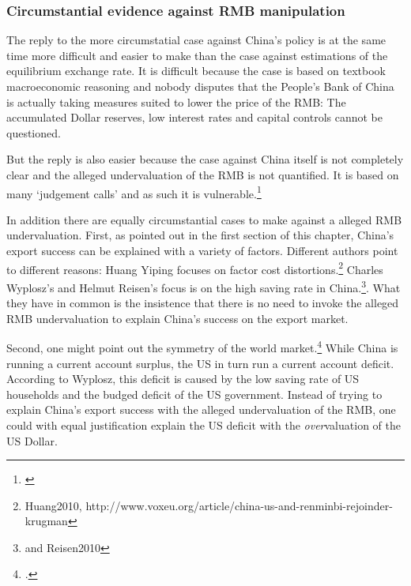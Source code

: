 \documentclass[11pt]{article}
\begin{document}



\subsubsection{Circumstantial evidence against RMB manipulation}

The reply to the more circumstatial case against China's policy is at the same time more difficult and easier to make than the case against estimations of the equilibrium exchange rate. It is difficult because the case is based on textbook macroeconomic reasoning and nobody disputes that the People's Bank of China is actually taking measures suited to lower the price of the RMB: The accumulated Dollar reserves, low interest rates and capital controls cannot be questioned.

But the reply is also easier because the case against China itself is not completely clear and the alleged undervaluation of the RMB is not quantified. It is based on many  `judgement calls' and as such it is vulnerable.\footnote{\cite[p. 85]{CheungChinnFujii2010}}

In addition there are equally circumstantial cases to make against a alleged RMB undervaluation. First, as pointed out in the first section of this chapter, China's export success can be explained with a variety of factors.  Different authors point to different reasons: Huang Yiping focuses on factor cost distortions.\footnote{Huang2010, http://www.voxeu.org/article/china-us-and-renminbi-rejoinder-krugman} Charles Wyplosz's and Helmut Reisen's focus is on the high saving rate in China.\footnote{\cite[pp. 40]{Wyplosz2010} and \cite{p. 65}{Reisen2010}}. What they have in common is the insistence that there is no need to invoke the alleged RMB undervaluation to explain China's success on the export market.

Second, one might point out the symmetry of the world market.\footnote{\cite[pp. 39-40]{Wyplosz2010}.} While China is running a current account surplus, the US in turn run a current account deficit. According to Wyplosz, this deficit is caused by the low saving rate of US households and the budged deficit of the US government. Instead of trying to explain China's export success with the alleged undervaluation of the RMB, one could with equal justification explain the US deficit with the \emph{over}valuation of the US Dollar. 
\end{document}
